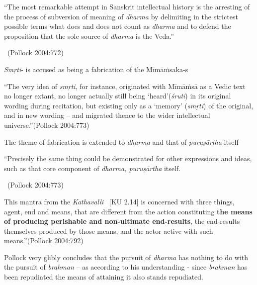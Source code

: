 \smallskip

\begin{myquote}
“The most remarkable attempt in Sanskrit intellectual history is the arresting of the process of subversion of meaning of \textit{dharma} by delimiting in the strictest possible terms what does and does not count as \textit{dharma} and to defend the proposition that the sole source of \textit{dharma} is the Veda.”

~\hfill (Pollock 2004:772)
\end{myquote}

\smallskip

\textit{Smṛti}- is accused as being a fabrication of the Mīmāṁsaka-s

\smallskip

\begin{myquote}
“The very idea of \textit{smṛti}, for instance, originated with Mīmāṁsā as a Vedic text no longer extant, no longer actually still being ‘heard’(\textit{śruti}) in its original wording during recitation, but existing only as a ‘memory’ (\textit{smṛti}) of the original, and in new wording – and migrated thence to the wider intellectual universe.”\hfill (Pollock 2004:773)
\end{myquote}

\medskip

The theme of fabrication is extended to \textit{dharma} and that of \textit{puruṣārtha} itself

\medskip

\begin{myquote}
“Precisely the same thing could be demonstrated for other expressions and ideas, such as that core component of \textit{dharma, puruṣārtha} itself.

~\hfill (Pollock 2004:773)
\end{myquote}

\begin{myquote}
This mantra from the \textit{Kathavalli}  [KU 2.14] is concerned with three things, agent, end and means, that are different from the action constituting \textbf{the means of producing perishable and non-ultimate end-results}, the end-results themselves produced by those means, and the actor active with such means.”\hfill (Pollock 2004:792)
\end{myquote}

Pollock very glibly concludes that the pursuit of \textit{dharma} has nothing to do with the pursuit of \textit{brahman} – as according to his understanding - since \textit{brahman} has been repudiated the means of attaining it also stands repudiated.

